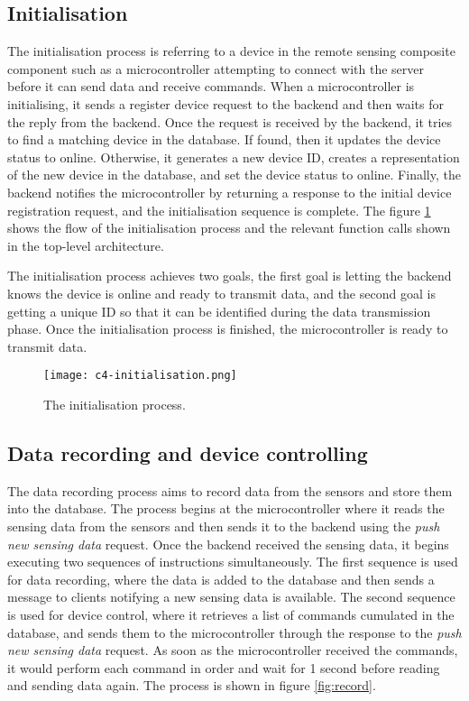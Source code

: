 \documentclass[../thesis.tex]{subfiles}
\begin{document}
\subsection{Initialisation}

The initialisation process is referring to a device in the remote sensing composite component such as a microcontroller attempting to connect with the server before it can send data and receive commands. When a microcontroller is initialising, it sends a register device request to the backend and then waits for the reply from the backend. Once the request is received by the backend, it tries to find a matching device in the database. If found, then it updates the device status to online. Otherwise, it generates a new device ID, creates a representation of the new device in the database, and set the device status to online. Finally, the backend notifies the microcontroller by returning a response to the initial device registration request, and the initialisation sequence is complete. The figure \ref{fig:init} shows the flow of the initialisation process and the relevant function calls shown in the top-level architecture.

The initialisation process achieves two goals, the first goal is letting the backend knows the device is online and ready to transmit data, and the second goal is getting a unique ID so that it can be identified during the data transmission phase. Once the initialisation process is finished, the microcontroller is ready to transmit data.

\begin{figure}[!ht]
\centering
\texttt{[image: c4-initialisation.png]}
\caption{The initialisation process.}
\label{fig:init}
\end{figure}


\subsection{Data recording and device controlling}

The data recording process aims to record data from the sensors and store them into the database. The process begins at the microcontroller where it reads the sensing data from the sensors and then sends it to the backend using the \emph{push new sensing data} request. Once the backend received the sensing data, it begins executing two sequences of instructions simultaneously. The first sequence is used for data recording, where the data is added to the database and then sends a message to clients notifying a new sensing data is available. The second sequence is used for device control, where it retrieves a list of commands cumulated in the database, and sends them to the microcontroller through the response to the \emph{push new sensing data} request. As soon as the microcontroller received the commands, it would perform each command in order and wait for 1 second before reading and sending data again. The process is shown in figure \ref{fig:record}.
\end{document}
